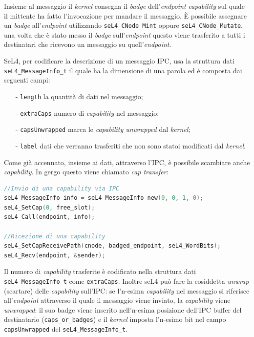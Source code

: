 Insieme al messaggio il \textit{kernel} consegna il \textit{badge} dell'\textit{endpoint capability} sul quale il mittente ha fatto l'invocazione per mandare il messaggio. È possibile assegnare un \textit{badge} all'\textit{endpoint} utilizzando \texttt{seL4\_CNode\_Mint} oppure \texttt{seL4\_CNode\_Mutate}, una volta che è stato messo il \textit{badge} sull'\textit{endpoint} questo viene trasferito a tutti i destinatari che ricevono un messaggio su quell'\textit{endpoint}.

SeL4, per codificare la descrizione di un messaggio IPC, usa la struttura dati \texttt{seL4\_MessageInfo\_t} il quale ha la dimensione di una parola ed è composta dai seguenti campi:
\begin{itemize}
	\item[-] \texttt{length} la quantità di dati nel messaggio;
	\item[-] \texttt{extraCaps} numero di \textit{capability} nel messaggio;
	\item[-] \texttt{capsUnwrapped} marca le \textit{capability unwrapped} dal \textit{kernel};
	\item[-] \texttt{label} dati che verranno trasferiti che non sono statoi modificati dal \textit{kernel}.
\end{itemize}

Come già accennato, insieme ai dati, attraverso l'IPC, è possibile scambiare anche \textit{capability}. In gergo questo viene chiamato \textit{cap transfer}:
\begin{lstlisting}[language=C++]
//Invio di una capability via IPC
seL4_MessageInfo info = seL4_MessageInfo_new(0, 0, 1, 0);
seL4_SetCap(0, free_slot);
seL4_Call(endpoint, info);

//Ricezione di una capability
seL4_SetCapReceivePath(cnode, badged_endpoint, seL4_WordBits);
seL4_Recv(endpoint, &sender);
\end{lstlisting}

Il numero di \textit{capability} trasferite è codificato nella struttura dati \texttt{seL4\_MessageInfo\_t} come \texttt{extraCaps}.
Inoltre seL4 può fare la cosiddetta \textit{unwrap} (scartare) delle \textit{capability} sull'IPC: se l'n-esima \textit{capability} nel messaggio si riferisce all'\textit{endpoint} attraverso il quale il messaggio viene inviato, la \textit{capability} viene \textit{unwrapped}: il suo badge viene inserito nell'n-esima posizione dell'IPC buffer del destinatario (\texttt{caps\_or\_badges}) e il \textit{kernel} imposta l'n-esimo bit nel campo \texttt{capsUnwrapped} del \texttt{seL4\_MessageInfo\_t}.

